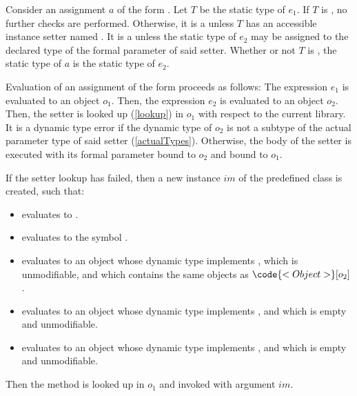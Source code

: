\documentclass[makeidx]{article}
\begin{document}
{\LMHash{}%
Consider an assignment $a$ of the form .
Let $T$ be the static type of $e_1$.
If $T$ is \DYNAMIC, no further checks are performed.
Otherwise, it is a  unless
$T$ has an accessible instance setter named .
It is a  unless the static type of $e_2$
may be assigned to the declared type of the formal parameter of said setter.
Whether or not $T$ is \DYNAMIC,
the static type of $a$ is the static type of $e_2$.

\LMHash{}%
Evaluation of an assignment of the form 
proceeds as follows:
The expression $e_1$ is evaluated to an object $o_1$.
Then, the expression $e_2$ is evaluated to an object $o_2$.
Then, the setter  is looked up (\ref{lookup})
in $o_1$ with respect to the current library.
It is a dynamic type error if the dynamic type of $o_2$
is not a subtype of the actual parameter type of said setter
(\ref{actualTypes}).
Otherwise, the body of the setter is executed with
its formal parameter bound to $o_2$ and \THIS{} bound to $o_1$.

\LMHash{}%
If the setter lookup has failed, then a new instance $im$ of
the predefined class  is created, such that:
\begin{itemize}
\item {} evaluates to \TRUE.
\item {} evaluates to the symbol .
\item {} evaluates to an object
  whose dynamic type implements ,
  which is unmodifiable, and which contains the same objects as
  $\code{<Object>}[o_2]$.
\item {} evaluates to an object
  whose dynamic type implements ,
  and which is empty and unmodifiable.
\item {} evaluates to an object
  whose dynamic type implements ,
  and which is empty and unmodifiable.
\end{itemize}

\LMHash{}%
Then the method  is looked up in $o_1$
and invoked with argument $im$.


}
\end{document}
